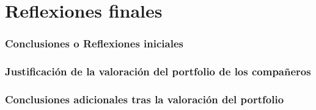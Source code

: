 \chapter{Reflexiones finales}\label{cap:reflexiones-finales}

\subsection{Conclusiones o Reflexiones iniciales}

\subsection{Justificación de la valoración del portfolio de los compañeros}

\subsection{Conclusiones adicionales tras la valoración del portfolio}